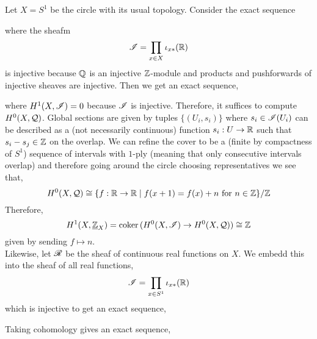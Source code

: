 \documentclass[12pt]{article}
\begin{document}
Let $X = S^1$ be the circle with its usual topology. Consider the exact sequence
\begin{center}
\end{center}
where the sheafm
\[ \mathscr{I} = \prod\limits_{x \in X} \iota_{x *}(\mathbb{R}) \]
is injective because $\mathbb{Q}$ is an injective $\mathbb{Z}$-module and products and  pushforwards of injective sheaves are injective.
Then we get an exact sequence,
\begin{center}
\end{center}
where $H^1(X, \mathscr{I}) = 0$ because $\mathscr{I}$ is injective. Therefore, it suffices to compute $H^0(X, \mathcal{Q})$. Global sections are given by tuples $\{(U_i, s_i)\}$ where $s_i \in \mathscr{I}(U_i)$ can be described as a (not necessarily continuous) function $s_i : U \to \mathbb{R}$ such that $s_i - s_j \in \mathbb{Z}$ on the overlap. We can refine the cover to be a (finite by compactness of $S^1$) sequence of intervals with $1$-ply (meaning that only consecutive intervals overlap) and therefore going around the circle choosing representatives we see that,
\[ H^0(X, \mathcal{Q}) \cong \{ f : \mathbb{R} \to \mathbb{R} \mid f(x + 1) = f(x) + n \text{ for } n \in \mathbb{Z} \} / \mathbb{Z} \]
Therefore,
\[ H^1(X, \underline{\mathbb{Z}}_X) = \operatorname{\mathrm{coker}}{(H^0(X, \mathscr{I}) \to H^0(X, \mathcal{Q}))} \cong \mathbb{Z} \]
given by sending $f \mapsto n$.
\bigskip\\
Likewise, let $\mathscr{R}$ be the sheaf of continuous real functions on $X$. We embedd this into the sheaf of all real functions,
\[ \mathscr{I} = \prod\limits_{x \in S^1} \iota_{x *}(\mathbb{R}) \]
which is injective to get an exact sequence,
\begin{center}
\end{center}
Taking cohomology gives an exact sequence,
\begin{center}
\end{center}
\end{document}
